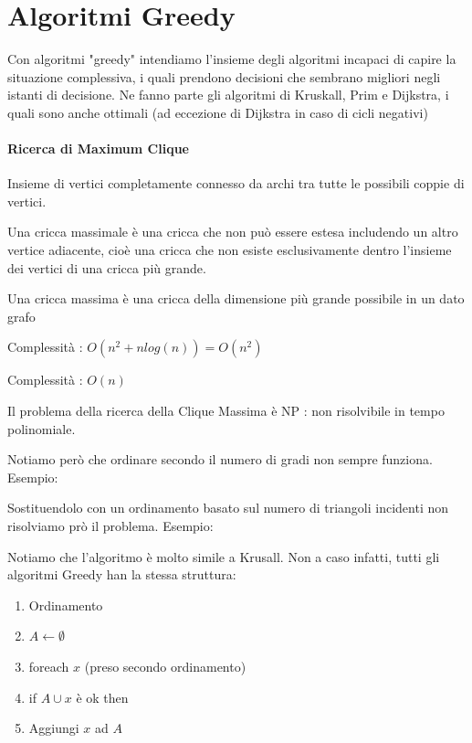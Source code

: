 \documentclass[tikz]{article}
\let\oldparagraph\paragraph
\renewcommand{\paragraph}[1]{\oldparagraph{#1}\mbox{}}
\begin{document}
{{\section{Algoritmi Greedy}
Con algoritmi "greedy" intendiamo l'insieme degli algoritmi incapaci di capire la situazione complessiva, i quali prendono decisioni che sembrano migliori negli istanti di decisione. Ne fanno parte gli algoritmi di Kruskall, Prim e Dijkstra, i quali sono anche ottimali (ad eccezione di Dijkstra in caso di cicli negativi)

\paragraph{Ricerca di Maximum Clique}

Insieme di vertici completamente connesso da archi tra tutte le possibili coppie di vertici.

Una cricca massimale è una cricca che non può essere estesa includendo un altro vertice adiacente, cioè una cricca che non esiste esclusivamente dentro l'insieme dei vertici di una cricca più grande.

Una cricca massima è una cricca della dimensione più grande possibile in un dato grafo




Complessità : $O(n^2 + nlog(n)) = O(n^2)$



Complessità : $O(n)$

Il problema della ricerca della Clique Massima è NP : non risolvibile in tempo polinomiale.

Notiamo però che ordinare secondo il numero di gradi non sempre funziona. Esempio:



Sostituendolo con un ordinamento basato sul numero di triangoli incidenti non risolviamo prò il problema. Esempio:



Notiamo che l'algoritmo è molto simile a Krusall. Non a caso infatti, tutti gli algoritmi Greedy han la stessa struttura:

\begin{enumerate}
\item Ordinamento
\item $ A \leftarrow \emptyset$
\item foreach $x$ (preso secondo ordinamento)
\item \hspace{\parindent} if $A \cup x$ è ok then
\item \hspace{\parindent} \hspace{\parindent} Aggiungi $x$ ad $A$
\end{enumerate}

}}
\end{document}
